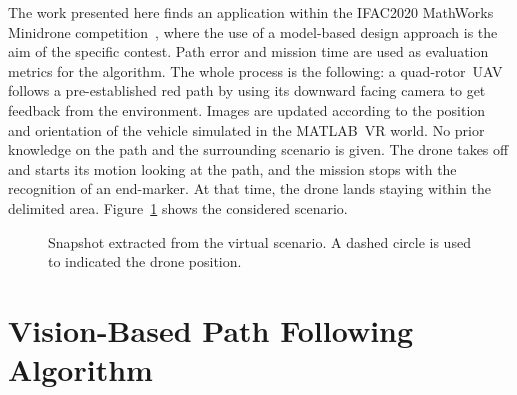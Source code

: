 The work presented here finds an application within the IFAC2020 MathWorks Minidrone competition~\cite{4_Mathworks_url}, where the use of a model-based design approach is the aim of the specific contest. Path error and mission time are used as evaluation metrics for the algorithm. The whole process is the following: a quad-rotor~\gls{UAV} follows a pre-established red path by using its downward facing camera to get feedback from the environment. Images are updated according to the position and orientation of the vehicle simulated in the MATLAB~\gls{VR} world. No prior knowledge on the path and the surrounding scenario is given. The drone takes off and starts its motion looking at the path, and the mission stops with the recognition of an end-marker. At that time, the drone lands staying within the delimited area. Figure~\ref{fig:arena} shows the considered scenario. 
%
\begin{figure}[h]
	\centering
	\caption{Snapshot extracted from the virtual scenario. A dashed circle is used to indicated the drone position.}
	\label{fig:arena}
\end{figure}

\section{Vision-Based Path Following Algorithm}
\label{sec:purPursuitTrackingAlgorithm}


